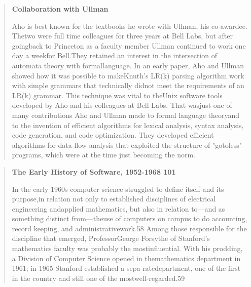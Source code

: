 \begin{quotation}
\textbf{Collaboration with Ullman}

Aho is best known for the textbooks he wrote with Ullman, his co-awardee. 
Thetwo were full time colleagues for three years at Bell Labs, but after 
goingback to Princeton as a faculty member Ullman continued to work one day a 
weekfor Bell.They retained an interest in the intersection of automata theory 
with formallanguage. In an early paper, Aho and Ullman showed how it was 
possible to makeKnuth's LR(k) parsing algorithm work with simple grammars that 
technically didnot meet the requirements of an LR(k) grammar. This technique 
was vital to theUnix software tools developed by Aho and his colleagues at Bell 
Labs. That wasjust one of many contributions Aho and Ullman made to formal 
language theoryand to the invention of efficient algorithms for lexical 
analysis, syntax analysis, code generation, and code optimization. They 
developed efficient algorithms for data-flow analysis that exploited the 
structure of "gotoless" programs, which were at the time just becoming the norm.
\cite{aho_turing_award_2020}
\end{quotation}
\begin{quotation}
\textbf{The Early History of Software, 1952-1968 101}

In the early 1960s computer science struggled to define itself and its 
purpose,in relation not only to established disciplines of electrical 
engineering andapplied mathematics, but also in relation to—and as something 
distinct from—theuse of computers on campus to do accounting, record keeping, 
and administrativework.58 Among those responsible for the discipline that 
emerged, ProfessorGeorge Forsythe of Stanford's mathematics faculty was 
probably the mostinfluential. With his prodding, a Division of Computer Science 
opened in themathematics department in 1961; in 1965 Stanford established a 
sepa-ratedepartment, one of the first in the country and still one of the 
mostwell-regarded.59
\cite{history_of_modern_computing_2003_ceruzzi}
\end{quotation}
